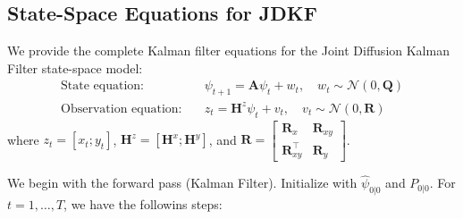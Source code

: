 \documentclass[11pt]{article}
\theoremstyle{plain}
\theoremstyle{definition}
\theoremstyle{remark}
\numberwithin{equation}{section}
\begin{document}
\subsection{State-Space Equations for JDKF}

We provide the complete Kalman filter equations for the Joint Diffusion Kalman Filter state-space model:
\begin{equation}
\begin{aligned}
\text{State equation:} \quad & \psi_{t+1} = \mathbf{A} \psi_t + w_t, \quad w_t \sim \mathcal{N}(0, \mathbf{Q})\\
\text{Observation equation:} \quad & z_t = \mathbf{H}^z \psi_t + v_t, \quad v_t \sim \mathcal{N}(0, \mathbf{R})
\end{aligned}
\end{equation}
where $z_t = [x_t; y_t]$, $\mathbf{H}^z = [\mathbf{H}^x; \mathbf{H}^y]$, and $\mathbf{R} = \begin{bmatrix} \mathbf{R}_x & \mathbf{R}_{xy} \\ \mathbf{R}^\top_{xy} & \mathbf{R}_y \end{bmatrix}$.

We begin with the forward pass (Kalman Filter).  Initialize with $\hat{\psi}_{0|0}$ and $P_{0|0}$. For $t = 1, \ldots, T$, we have the followins steps:
\end{document}
